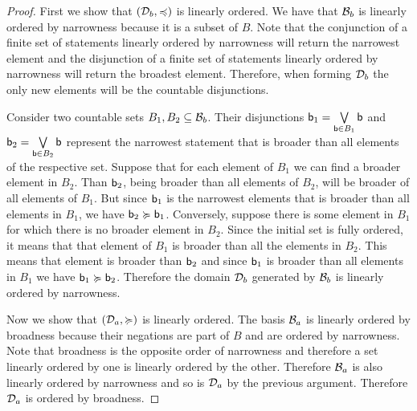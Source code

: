 \documentclass[11pt,letterpaper,fleqn]{memoir} %
\begin{document}
\begin{mathSection}
\begin{proof}
	First we show that $(\edomain_b, \narrower)$ is linearly ordered. We have that $\basis_b$ is linearly ordered by narrowness because it is a subset of $B$. Note that the conjunction of a finite set of statements linearly ordered by narrowness will return the narrowest element and the disjunction of a finite set of statements linearly ordered by narrowness will return the broadest element. Therefore, when forming $\edomain_b$ the only new elements will be the countable disjunctions.
	
	Consider two countable sets $B_1, B_2 \subseteq \basis_b$. Their disjunctions $\stmt[b]_1 = \bigOR\limits_{\stmt[b] \in B_1} \stmt[b]$ and $\stmt[b]_2 = \bigOR\limits_{\stmt[b] \in B_2} \stmt[b]$ represent the narrowest statement that is broader than all elements of the respective set. Suppose that for each element of $B_1$ we can find a broader element in $B_2$. Than $\stmt[b]_2$, being broader than all elements of $B_2$, will be broader of all elements of $B_1$. But since $\stmt[b]_1$ is the narrowest elements that is broader than all elements in $B_1$, we have $\stmt[b]_2 \broader \stmt[b]_1$. Conversely, suppose there is some element in $B_1$ for which there is no broader element in $B_2$. Since the initial set is fully ordered, it means that that element of $B_1$ is broader than all the elements in $B_2$. This means that element is broader than $\stmt[b]_2$ and since $\stmt[b]_1$ is broader than all elements in $B_1$ we have $\stmt[b]_1 \broader \stmt[b]_2$. Therefore the domain $\edomain_b$ generated by $\basis_b$ is linearly ordered by narrowness.
	
	Now we show that $(\edomain_a, \broader)$ is linearly ordered. The basis $\basis_a$ is linearly ordered by broadness because their negations are part of $B$ and are ordered by narrowness. Note that broadness is the opposite order of narrowness and therefore a set linearly ordered by one is linearly ordered by the other. Therefore $\basis_a$ is also linearly ordered by narrowness and so is $\edomain_a$ by the previous argument. Therefore $\edomain_a$ is ordered by broadness.
	

\end{proof}
\end{mathSection}
\end{document}
